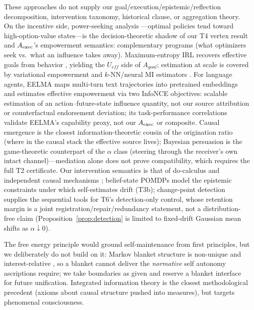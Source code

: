 These approaches do not supply our goal/execution/epistemic/reflection
decomposition, intervention taxonomy, historical clause, or aggregation
theory. On the incentive side, power-seeking analysis
\citep{turner2021}---optimal policies tend toward high-option-value states---is
the decision-theoretic shadow of our T4 vertex result and $A_{\mathrm{exec}}$'s
empowerment semantics: complementary programs (what optimizers seek vs.\ what
an influence takes away). Maximum-entropy IRL recovers effective goals from
behavior \citep{ziebart2008}, yielding the $U_{eff}$ side of $A_{goal}$;
estimation at scale is covered by variational empowerment
\citep{mohamed2015} and $k$-NN/neural MI estimators
\citep{kraskov2004,belghazi2018}. For language agents, EELMA
\citep{song2026eelma} maps multi-turn text trajectories into pretrained
embeddings and estimates effective empowerment via two InfoNCE objectives:
scalable estimation of an action--future-state influence quantity, not our
source attribution or counterfactual endorsement deviation; its
task-performance correlations validate EELMA's capability proxy, not our
$A_{\mathrm{exec}}$ or composite. Causal emergence \citep{hoel2013} is the closest
information-theoretic cousin of the origination ratio (where in the causal
stack the effective source lives); Bayesian persuasion \citep{kamenica2011}
is the game-theoretic counterpart of the $\alpha$ class (steering through the
receiver's own intact channel)---mediation alone does not prove compatibility,
which requires the full T2 certificate. Our intervention semantics is that of
do-calculus and independent causal mechanisms \citep{peters2017}; belief-state
POMDPs \citep{kaelbling1998} model the epistemic constraints under which
self-estimates drift (T3b); change-point detection \citep{truong2020} supplies
the sequential tools for T6's detection-only control, whose retention margin
is a joint registration/repair/redundancy statement, not a distribution-free
claim (Proposition~\ref{prop:detection} is limited to fixed-drift Gaussian
mean shifts as $\alpha\downarrow0$).

The free energy principle \citep{friston2010,friston2023} would ground
self-maintenance from first principles, but we deliberately do not build on
it: Markov blanket structure is non-unique and interest-relative
\citep{bruineberg2022}, so a blanket cannot deliver the \emph{normative} self
autonomy ascriptions require; we take boundaries as given and reserve a
blanket interface for future unification. Integrated information theory
\citep{oizumi2014,tegmark2016} is the closest methodological precedent
(axioms about causal structure pushed into measures), but targets phenomenal
consciousness.


